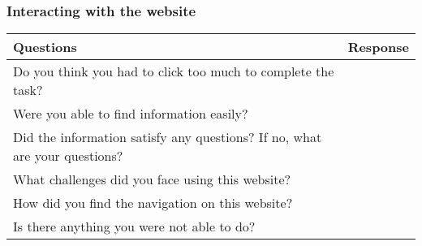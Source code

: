 \subsubsection{Interacting with the website}

\begin{table}[h]
\centering
\renewcommand{\arraystretch}{1.5}
\begin{tabularx}{\textwidth}{|X|X|}
\hline
\textbf{Questions} & \textbf{Response} \\ \hline
Do you think you had to click too much to complete the task? &  \\ \hline
Were you able to find information easily? &  \\ \hline
Did the information satisfy any questions? If no, what are your questions? &  \\ \hline
What challenges did you face using this website? &  \\ \hline
How did you find the navigation on this website? &  \\ \hline
Is there anything you were not able to do? &  \\ \hline
\end{tabularx}
\end{table}